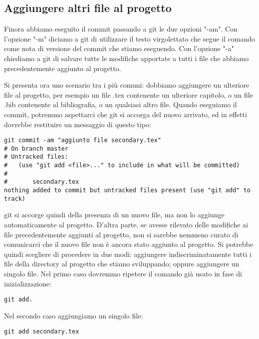 \documentclass{article}
\begin{document}
\subsection{Aggiungere altri file al progetto}
Finora abbiamo eseguito il commit passando a git le due opzioni "-am".
Con l'opzione "-m" diciamo a git di utilizzare il testo virgolettato che segue
il comando come nota di versione del commit che stiamo eseguendo.
Con l'opzione "-a" chiediamo a git di salvare tutte le modifiche apportate a
tutti i file che abbiamo precedentemente aggiunto al progetto.

Si presenta ora uno scenario tra i più comuni: dobbiamo aggiungere un ulteriore
file al progetto, per esempio un file .tex contenente un ulteriore capitolo, o
un file .bib contenente al bibliografia, o un qualsiasi altro file.
Quando eseguiamo il commit, potremmo aspettarci che git si accorga del nuovo
arrivato, ed in effetti dovrebbe restituire un messaggio di questo tipo:

\begin{framed}
\begin{lstlisting}
git commit -am "aggiunto file secondary.tex"
# On branch master
# Untracked files:
#   (use "git add <file>..." to include in what will be committed)
#
#       secondary.tex
nothing added to commit but untracked files present (use "git add" to track)
\end{lstlisting}
\end{framed}

git si accorge quindi della presenza di un nuovo file, ma non lo aggiunge
automaticamente al progetto. D'altra parte, se avesse rilevato delle modifiche
ai file precedentemente aggiunti al progetto, non si sarebbe nemmeno curato di
comunicarci che il nuovo file non è ancora stato aggiunto al progetto.
Si potrebbe quindi scegliere di procedere in due modi: aggiungere
indiscriminatamente tutti i file della directory al progetto che stiamo
sviluppando; oppure aggiungere un singolo file.
Nel primo caso dovremmo ripetere il comando già usato in fase di
inizializzazione:

\begin{framed}
\begin{lstlisting}
git add.
\end{lstlisting}
\end{framed}

Nel secondo caso aggiungiamo un singolo file:

\begin{framed}
\begin{lstlisting}
git add secondary.tex
\end{lstlisting}
\end{framed}
\end{document}
